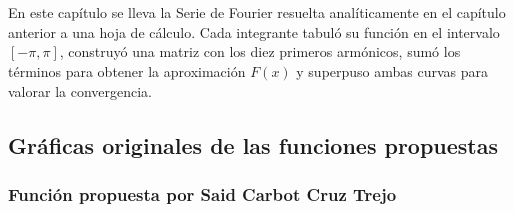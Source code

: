 %
%
%
%
%

\chapter{\TituloCapDos}
\label{cap:02}

En este capítulo se lleva la Serie de Fourier resuelta analíticamente en el capítulo anterior a una hoja de cálculo. Cada integrante tabuló su función en el intervalo $[-\pi, \pi]$, construyó una matriz con los diez primeros armónicos, sumó los términos para obtener la aproximación $F(x)$ y superpuso ambas curvas para valorar la convergencia.

\section{Gráficas originales de las funciones propuestas}
\label{sec:cap02:originales}

\subsection{Función propuesta por Said Carbot Cruz Trejo}
\label{sec:cap02:orig:said}

